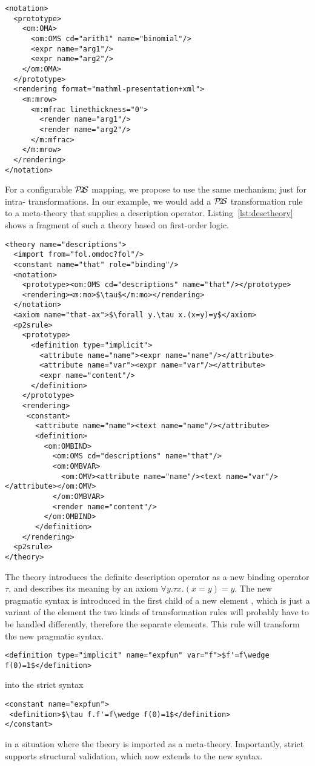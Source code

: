 \documentclass{article}
\def\ptos{\ensuremath{\mathcal{P}\kern-.2em2\kern-.2em\mathcal{S}}}
\begin{document}
\begin{lstlisting}[label=lst:bc-notation,caption=A notation for a binomial coefficient]
<notation>
  <prototype>
    <om:OMA> 
      <om:OMS cd="arith1" name="binomial"/>
      <expr name="arg1"/>
      <expr name="arg2"/>
    </om:OMA>
  </prototype>
  <rendering format="mathml-presentation+xml">
    <m:mrow>
      <m:mfrac linethickness="0">
        <render name="arg1"/>
        <render name="arg2"/>
      </m:mfrac>
    </m:mrow>
  </rendering>
</notation>
\end{lstlisting}

For a configurable {\ptos} mapping, we propose to use the same mechanism; just for
intra-{\omdoc} transformations. In our example, we would add a {\ptos} transformation rule
to a meta-theory that supplies a description operator. Listing~\ref{lst:desctheory} shows
a fragment of such a theory based on first-order logic.

\begin{lstlisting}[label=lst:desctheory,caption=A Meta Theory that supplies implicit definitions,mathescape]
<theory name="descriptions">
  <import from="fol.omdoc?fol"/>
  <constant name="that" role="binding"/>
  <notation>
    <prototype><om:OMS cd="descriptions" name="that"/></prototype>
    <rendering><m:mo>$\tau$</m:mo></rendering>
  </notation>
  <axiom name="that-ax">$\forall y.\tau x.(x=y)=y$</axiom>
  <p2srule>
    <prototype>
      <definition type="implicit">
        <attribute name="name"><expr name="name"/></attribute>
        <attribute name="var"><expr name="var"/></attribute>
        <expr name="content"/>
      </definition>
    </prototype> 
    <rendering>
     <constant>
       <attribute name="name"><text name="name"/></attribute>
       <definition>
         <om:OMBIND>
           <om:OMS cd="descriptions" name="that"/>
           <om:OMBVAR>
             <om:OMV><attribute name="name"/><text name="var"/></attribute></om:OMV>
           </om:OMBVAR>
           <render name="content"/>
         </om:OMBIND>
       </definition>
    </rendering>
  <p2srule>
</theory>
\end{lstlisting}
The theory {} introduces the definite description operator
as a new binding operator $\tau$, and describes its meaning by an axiom $\forall y.\tau
x.(x=y)=y$. The new pragmatic syntax is introduced in the first child of a new element
{}, which is just a variant of the {} element the two
kinds of transformation rules will probably have to be handled differently, therefore the
separate elements. This rule will transform the new pragmatic syntax.
\begin{lstlisting}[mathescape]
<definition type="implicit" name="expfun" var="f">$f'=f\wedge f(0)=1$</definition>
\end{lstlisting}
into the strict syntax
\begin{lstlisting}[mathescape]
<constant name="expfun">
 <definition>$\tau f.f'=f\wedge f(0)=1$</definition>
</constant>
\end{lstlisting}
in a situation where the theory {} is imported as a
meta-theory. Importantly, strict {\omdoc} supports structural validation, which now
extends to the new syntax. 
\end{document}
